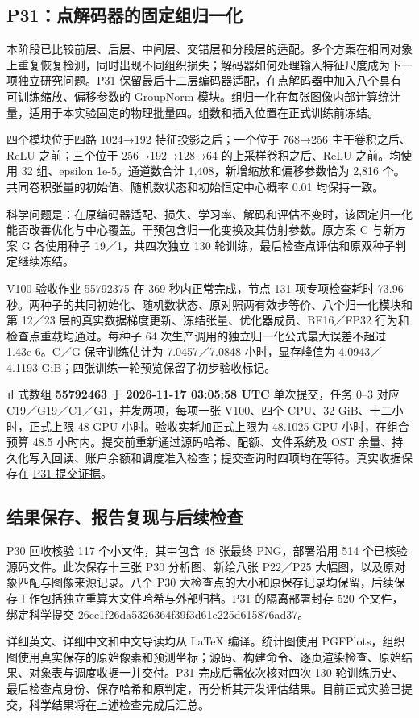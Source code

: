 \documentclass[
  11pt,
  fontset=fandol]{ctexart}
\begin{document}
\subsection{P31：点解码器的固定组归一化}\label{p31ux70b9ux89e3ux7801ux5668ux7684ux56faux5b9aux7ec4ux5f52ux4e00ux5316}

本阶段已比较前层、后层、中间层、交错层和分段层的适配。多个方案在相同对象上重复恢复检测，同时出现不同组织损失；解码器如何处理输入特征尺度成为下一项独立研究问题。P31
保留最后十二层编码器适配，在点解码器中加入八个具有可训练缩放、偏移参数的
GroupNorm
模块。组归一化在每张图像内部计算统计量，适用于本实验固定的物理批量四。组数和插入位置在正式训练前冻结。

四个模块位于四路 1024→192 特征投影之后；一个位于 768→256
主干卷积之后、ReLU 之前；三个位于 256→192→128→64 的上采样卷积之后、ReLU
之前。均使用 32 组、epsilon 1e-5。通道数合计
1,408，新增缩放和偏移参数恰为 2,816
个。共同卷积张量的初始值、随机数状态和初始恒定中心概率 0.01 均保持一致。

科学问题是：在原编码器适配、损失、学习率、解码和评估不变时，该固定归一化能否改善优化与中心覆盖。干预包含归一化变换及其仿射参数。原方案
C 与新方案 G 各使用种子 19／1，共四次独立 130
轮训练，最后检查点评估和原双种子判定继续冻结。

V100 验收作业 55792375 在 369 秒内正常完成，节点 131 项专项检查耗时
73.96
秒。两种子的共同初始化、随机数状态、原对照两有效步等价、八个归一化模块和第
12／23 层的真实数据梯度更新、冻结张量、优化器成员、BF16／FP32
行为和检查点重载均通过。每种子 64
次生产调用的独立归一化公式最大误差不超过 1.43e-6。C／G 保守训练估计为
7.0457／7.0848 小时，显存峰值为 4.0943／4.1193
GiB；四张训练一轮预览保留了初步验收标记。

正式数组 \textbf{55792463} 于 \textbf{2026-11-17 03:05:58 UTC}
单次提交，任务 0--3 对应 C19／G19／C1／G1，并发两项，每项一张 V100、四个
CPU、32 GiB、十二小时，正式上限 48 GPU 小时。验收实耗加正式上限为
48.1025 GPU 小时，在组合预算 48.5
小时内。提交前重新通过源码哈希、配额、文件系统及 OST
余量、持久化写入回读、账户余额和调度准入检查；提交查询时四项均在等待。真实收据保存在
\href{../p31_submission_receipt.json}{P31 提交证据}。

\subsection{结果保存、报告复现与后续检查}\label{ux7ed3ux679cux4fddux5b58ux62a5ux544aux590dux73b0ux4e0eux540eux7eedux68c0ux67e5}

P30 回收核验 117 个小文件，其中包含 48 张最终 PNG，部署沿用 514
个已核验源码文件。此次保存十三张 P30 分析图、新绘八张 P22／P25
大幅图，以及原对象匹配与图像来源记录。八个 P30
大检查点的大小和原保存记录均保留，后续保存工作包括独立重算大文件哈希与外部归档。P31
的隔离部署封存 520 个文件，绑定科学提交
26ce1f26da5326364f39f3d61c225d615876ad37。

详细英文、详细中文和中文导读均从 LaTeX 编译。统计图使用
PGFPlots，组织图使用真实保存的原始像素和预测坐标；源码、构建命令、逐页渲染检查、原始结果、对象表与调度收据一并交付。P31
完成后需依次核对四次 130
轮训练历史、最后检查点身份、保存哈希和原判定，再分析其开发评估结果。目前正式实验已提交，科学结果将在上述检查完成后汇总。
\end{document}
